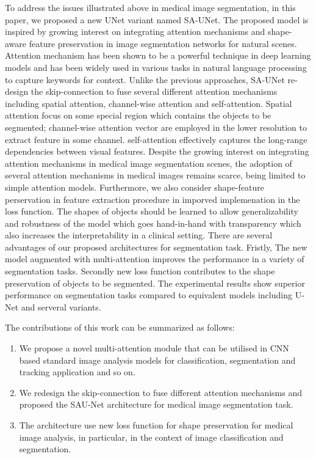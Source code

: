 \documentclass{ieeeaccess}
\begin{document}
  To address the issues illustrated above in medical image segmentation, in this paper, we proposed a new UNet variant named SA-UNet. The proposed model is inspired by growing interest on integrating attention mechanisms and shape-aware feature preservation in image segmentation networks for natural scenes. Attention mechanism has been shown to be a powerful technique in deep learning models and has been widely used in various tasks in natural language processing to capture keywords for context. Unlike the previous approaches, SA-UNet re-design the skip-connection to fuse several different attention mechanisms including spatial attention, channel-wise attention and self-attention. Spatial attention focus on some special region which contains the objects to be segmented; channel-wise attention vector are employed in the lower resolution to extract feature in some channel. self-attention effectively captures the long-range dependencies between visual features. Despite the growing interest on integrating attention mechanisms in medical image segmentation scenes, the adoption of several attention mechanisms in medical images remains scarce, being limited to simple attention models. Furthermore, we also consider shape-feature perservation in feature extraction procedure in imporved implemenation in the loss function.  The shapes of objects should be learned to allow generalizability and robustness of the model which goes hand-in-hand with transparency which also increases the interpretability in a clinical setting. There are several advantages of our proposed architectures for segmentation task. Fristly, The new model augmented with multi-attention improves the performance in a variety of  segmentation tasks. Secondly new loss function contributes to the shape preservation of objects to be segmented. The experimental results show superior performance on segmentation tasks compared to equivalent models including U-Net and serveral variants. 
  
  The contributions of this work can be summarized as follows:
  \begin{enumerate}
  \item We propose a novel multi-attention module that can be utilised in CNN based standard image analysis models for classification, segmentation and tracking application and so on.
  \item We redesign the skip-connection to fuse different attention mechanisms and proposed the SAU-Net architecture for medical image segmentation task. 
  \item The architecture use new loss function for shape preservation for medical image analysis, in particular, in the context of image classification and segmentation.
  \end{enumerate}
  
\end{document}
